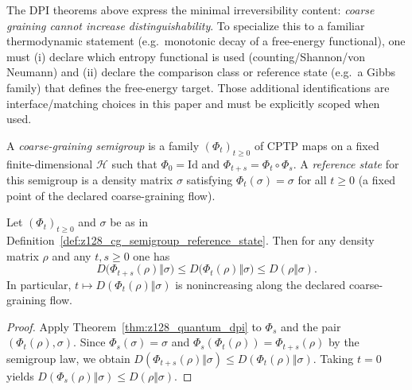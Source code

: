 \begin{remark}
\label{rem:z128_second_law_reading_dpi}
\InterfaceTag The DPI theorems above express the minimal irreversibility content: \emph{coarse graining cannot increase distinguishability}.
To specialize this to a familiar thermodynamic statement (e.g.\ monotonic decay of a free-energy functional), one must (i) declare which entropy functional is used (counting/Shannon/von Neumann) and (ii) declare the comparison class or reference state (e.g.\ a Gibbs family) that defines the free-energy target.
Those additional identifications are interface/matching choices in this paper and must be explicitly scoped when used.
\end{remark}

\begin{definition}
\label{def:z128_cg_semigroup_reference_state}
\InterfaceTag A \emph{coarse-graining semigroup} is a family $(\Phi_t)_{t\ge 0}$ of CPTP maps on a fixed finite-dimensional $\mathcal{H}$ such that $\Phi_0=\mathrm{Id}$ and $\Phi_{t+s}=\Phi_t\circ\Phi_s$.
A \emph{reference state} for this semigroup is a density matrix $\sigma$ satisfying $\Phi_t(\sigma)=\sigma$ for all $t\ge 0$ (a fixed point of the declared coarse-graining flow).
\end{definition}

\begin{proposition}
\label{prop:z128_dpi_lyapunov_semigroup}
\MathTag Let $(\Phi_t)_{t\ge 0}$ and $\sigma$ be as in Definition~\ref{def:z128_cg_semigroup_reference_state}.
Then for any density matrix $\rho$ and any $t,s\ge 0$ one has
\[
D\bigl(\Phi_{t+s}(\rho)\Vert\sigma\bigr)\le D\bigl(\Phi_t(\rho)\Vert\sigma\bigr)\le D(\rho\Vert\sigma).
\]
In particular, $t\mapsto D(\Phi_t(\rho)\Vert\sigma)$ is nonincreasing along the declared coarse-graining flow.
\end{proposition}
\begin{proof}
Apply Theorem~\ref{thm:z128_quantum_dpi} to $\Phi_s$ and the pair $(\Phi_t(\rho),\sigma)$.
Since $\Phi_s(\sigma)=\sigma$ and $\Phi_s(\Phi_t(\rho))=\Phi_{t+s}(\rho)$ by the semigroup law, we obtain
$D(\Phi_{t+s}(\rho)\Vert\sigma)\le D(\Phi_t(\rho)\Vert\sigma)$.
Taking $t=0$ yields $D(\Phi_s(\rho)\Vert\sigma)\le D(\rho\Vert\sigma)$.
\end{proof}

